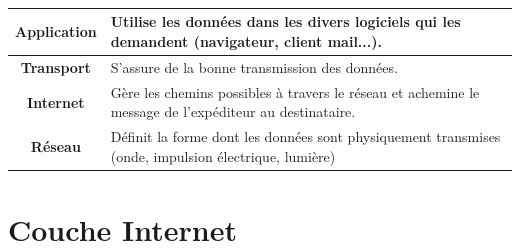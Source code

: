 \documentclass[svgnames,11pt]{beamer}
\begin{document}
\begin{frame}
    \frametitle{}

    \begin{center}
        \renewcommand{\arraystretch}{1.5}
        \begin{tabular}{|c|p{}|}
            \hline
            \textbf{Application} & Utilise les données dans les divers logiciels qui les demandent (navigateur, client mail...).          \\
            \hline
            \textbf{Transport}   & S'assure de la bonne transmission des données.                                                         \\
            \hline
            \textbf{Internet}    & Gère les chemins possibles à travers le réseau et achemine le message de l'expéditeur au destinataire. \\
            \hline
            \textbf{Réseau}      & Définit la forme dont les données sont physiquement transmises (onde, impulsion électrique, lumière)   \\
            \hline
        \end{tabular}
        \renewcommand{\arraystretch}{1}
    \end{center}
\end{frame}
\section{Couche Internet}
\end{document}

